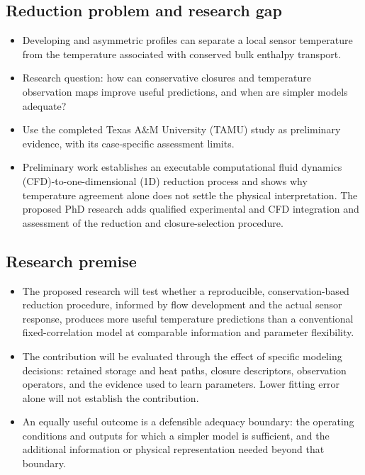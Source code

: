\subsection{Reduction problem and research gap}\label{subsec:reduction-problem-and-research-gap}
\begin{itemize}[leftmargin=*]
\item Developing and asymmetric profiles can separate a local sensor temperature from the temperature associated with conserved bulk enthalpy transport.
\item Research question: how can conservative closures and temperature observation maps improve useful predictions, and when are simpler models adequate?
\item Use the completed Texas A\&M University (TAMU) study as preliminary evidence, with its case-specific assessment limits.\cite{fierro2026cfdoneD,reis2024molten}
\item Preliminary work establishes an executable computational fluid dynamics (CFD)-to-one-dimensional (1D) reduction process and shows why temperature agreement alone does not settle the physical interpretation. The proposed PhD research adds qualified experimental and CFD integration and assessment of the reduction and closure-selection procedure.\cite{fierro2026cfdoneD}
\end{itemize}


\subsection{Research premise}\label{subsec:research-premise}
\begin{itemize}[leftmargin=*]
\item The proposed research will test whether a reproducible, conservation-based reduction procedure, informed by flow development and the actual sensor response, produces more useful temperature predictions than a conventional fixed-correlation model at comparable information and parameter flexibility.
\item The contribution will be evaluated through the effect of specific modeling decisions: retained storage and heat paths, closure descriptors, observation operators, and the evidence used to learn parameters. Lower fitting error alone will not establish the contribution.
\item An equally useful outcome is a defensible adequacy boundary: the operating conditions and outputs for which a simpler model is sufficient, and the additional information or physical representation needed beyond that boundary.
\end{itemize}
